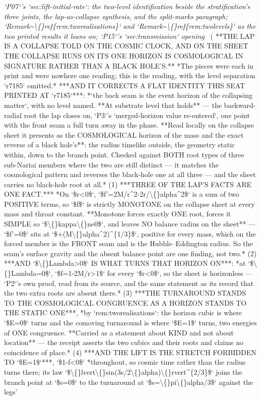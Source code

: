 \begin{description}
\textit{`P07`'s `sec:lift-initial-rate`: the two-level identification beside the stratification's three joints, the lap-as-collapse synthesis, and the split-marks paragraph; `Remark\textasciitilde{}\textbackslash\{\}ref\{rem:tworealisations\}` and `Remark\textasciitilde{}\textbackslash\{\}ref\{rem:twolevels\}` as the two printed results it leans on; `P15`'s `sec:transmission` opening} \ ( **THE LAP IS A COLLAPSE TOLD ON THE COSMIC CLOCK, AND ON THE SHEET THE COLLAPSE RUNS ON ITS ONE HORIZON IS COSMOLOGICAL IN SIGNATURE RATHER THAN A BLACK HOLE'S.** *The pieces were each in print and were nowhere one reading; this is the reading, with the level separation `r7185` omitted.*  ***AND IT CORRECTS A FLAT IDENTITY THIS SEAT PRINTED AT `r7185`***: *`the back seam is the event horizon of the collapsing matter`, with no level named. **At substrate level that holds** --- the backward-radial root the lap closes on, `P3`'s `merged-horizon value re-entered`, one point with the front seam a full turn away in the phase. **Read locally on the collapse sheet it presents as the COSMOLOGICAL horizon of the mass and the exact reverse of a black hole's**: the radius timelike outside, the geometry static within, down to the branch point. Checked against BOTH root types of three sub-Nariai members where the two are still distinct --- it matches the cosmological pattern and reverses the black-hole one at all three --- and the sheet carries no black-hole root at all.* (1) ***THREE OF THE LAP'S FACTS ARE ONE FACT.*** *On `\$r<0\$`, `\$f'=2M/r\textasciicircum{}2-2r/\textbackslash\{\}alpha\textasciicircum{}2\$` is a sum of two POSITIVE terms, so `\$f\$` is strictly MONOTONE on the collapse sheet at every mass and throat constant. **Monotone forces exactly ONE root, forces it SIMPLE so `\$\textbackslash\{\}kappa\textbackslash\{\}ne0\$`, and leaves NO balance radius on the sheet** --- `\$f'=0\$` sits at `\$+(M\textbackslash\{\}alpha\textasciicircum{}2)\textasciicircum{}\{1/3\}\$`, positive for every mass, which on the forced member is the FRONT seam and is the Hubble--Eddington radius. So the seam's surface gravity and the absent balance point are one finding, not two.* (2) ***AND `\$\textbackslash\{\}Lambda>0\$` IS WHAT TURNS THAT HORIZON ON***: *at `\$\textbackslash\{\}Lambda=0\$`, `\$f=1-2M/r>1\$` for every `\$r<0\$`, so the sheet is horizonless --- `P2`'s own proof, read from its source, and the same statement as its record that the two extra roots are absent there.* (3) ***THE TURNAROUND STANDS TO THE COSMOLOGICAL CONGRUENCE AS A HORIZON STANDS TO THE STATIC ONE***, *by `rem:tworealisations`: the horizon cubic is where `\$E=0\$` turns and the comoving turnaround is where `\$E=1\$` turns, two energies of ONE congruence. **Carried as a statement about KIND and not about location** --- the receipt asserts the two cubics and their roots and claims no coincidence of place.* (4) ***AND THE LIFT IS THE STRETCH FORBIDDEN TO `\$E=1\$`***, `\$1-f<0\$` *throughout, so cosmic time rather than the radius turns there; its law `\$\textbackslash\{\}lvert\textbackslash\{\}sin(3s/2\textbackslash\{\}alpha)\textbackslash\{\}rvert\textasciicircum{}\{2/3\}\$` joins the branch point at `\$s=0\$` to the turnaround at `\$s=\textbackslash\{\}pi\textbackslash\{\}alpha/3\$` against the legs' 
\end{description}
